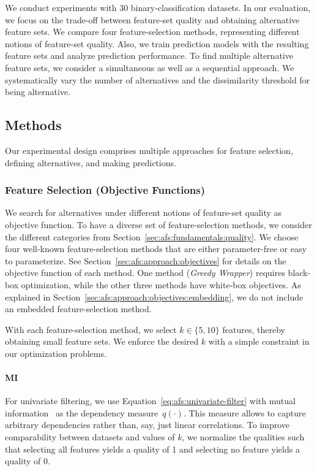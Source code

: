 \documentclass{article}
\theoremstyle{definition}
\begin{document}
We conduct experiments with 30 binary-classification datasets.
In our evaluation, we focus on the trade-off between feature-set quality and obtaining alternative feature sets.
We compare four feature-selection methods, representing different notions of feature-set quality.
Also, we train prediction models with the resulting feature sets and analyze prediction performance.
To find multiple alternative feature sets, we consider a simultaneous as well as a sequential approach.
We systematically vary the number of alternatives and the dissimilarity threshold for being alternative.

\subsection{Methods}
\label{sec:afs:experimental-design:approaches}

Our experimental design comprises multiple approaches for feature selection, defining alternatives, and making predictions.

\subsubsection{Feature Selection (Objective Functions)}
\label{sec:afs:experimental-design:approaches:feature-selection}

We search for alternatives under different notions of feature-set quality as objective function.
To have a diverse set of feature-selection methods, we consider the different categories from Section~\ref{sec:afs:fundamentals:quality}.
We choose four well-known feature-selection methods that are either parameter-free or easy to parameterize.
See Section~\ref{sec:afs:approach:objectives} for details on the objective function of each method.
One method (\emph{Greedy Wrapper}) requires black-box optimization, while the other three methods have white-box objectives.
As explained in Section~\ref{sec:afs:approach:objectives:embedding}, we do not include an embedded feature-selection method.

With each feature-selection method, we select $k \in \{5,10\}$ features, thereby obtaining small feature sets.
We enforce the desired $k$ with a simple constraint in our optimization problems.

\paragraph{MI}

For univariate filtering, we use Equation~\ref{eq:afs:univariate-filter} with mutual information~\cite{kraskov2004estimating} as the dependency measure~$q(\cdot)$.
This measure allows to capture arbitrary dependencies rather than, say, just linear correlations.
To improve comparability between datasets and values of $k$, we normalize the qualities such that selecting all features yields a quality of 1 and selecting no feature yields a quality of 0.
\end{document}
